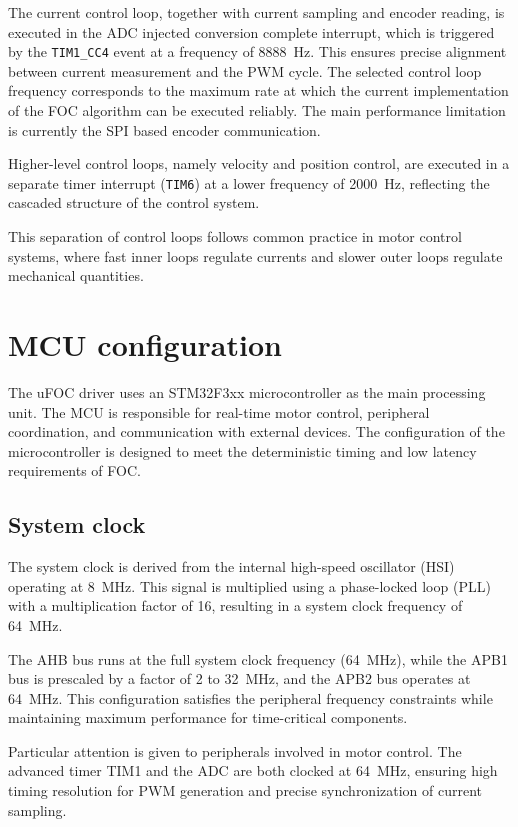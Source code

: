 The current control loop, together with current sampling and encoder reading, is executed in the ADC injected conversion complete interrupt,
which is triggered by the \texttt{TIM1\_CC4} event at a frequency of 8888~Hz. This ensures precise alignment between current measurement and the PWM cycle.
The selected control loop frequency corresponds to the maximum rate at which the current implementation of the FOC algorithm can be executed reliably.
The main performance limitation is currently the SPI based encoder communication.

Higher-level control loops, namely velocity and position control, are executed in a separate timer interrupt (\texttt{TIM6}) at a lower frequency of 2000~Hz, 
reflecting the cascaded structure of the control system.

This separation of control loops follows common practice in motor control systems, 
where fast inner loops regulate currents and slower outer loops regulate mechanical quantities.

\section{MCU configuration}

The uFOC driver uses an STM32F3xx microcontroller as the main processing unit. 
The MCU is responsible for real-time motor control, peripheral coordination, 
and communication with external devices. The configuration of the microcontroller is designed to 
meet the deterministic timing and low latency requirements of FOC.

\subsection{System clock}

The system clock is derived from the internal high-speed oscillator (HSI) operating at 8~MHz. 
This signal is multiplied using a phase-locked loop (PLL) with a multiplication factor of 16, resulting in a system clock frequency of 64~MHz.

The AHB bus runs at the full system clock frequency (64~MHz), while the APB1 bus is prescaled by a factor of 2 to 32~MHz, and the APB2 bus operates at 64~MHz. This configuration satisfies the peripheral frequency constraints while maintaining maximum performance for time-critical components.

Particular attention is given to peripherals involved in motor control. The advanced timer TIM1 and the ADC are both clocked at 64~MHz, ensuring high timing resolution for PWM generation and precise synchronization of current sampling.

